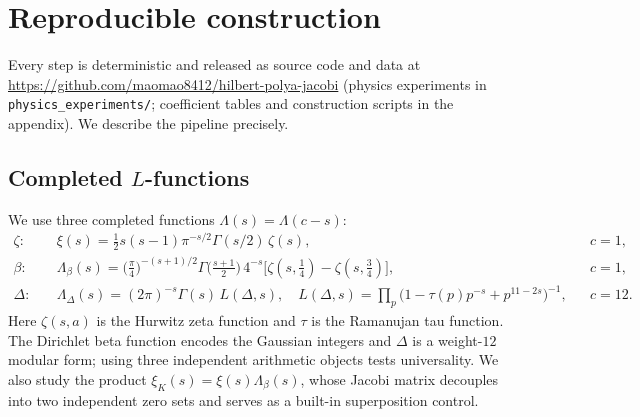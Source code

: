\documentclass[aps,prx,reprint,floatfix]{revtex4-2}
\begin{document}
\section{Reproducible construction}
\label{sec:methods}

Every step is deterministic and released as source code and data at
\url{https://github.com/maomao8412/hilbert-polya-jacobi} (physics experiments
in \texttt{physics\_experiments/}; coefficient tables and construction
scripts in the appendix). We describe the pipeline precisely.

\subsection{Completed $L$-functions}
We use three completed functions $\Lambda(s)=\Lambda(c-s)$:
\begin{align}
\zeta:\quad &\xi(s)=\tfrac12 s(s-1)\pi^{-s/2}\Gamma(s/2)\,\zeta(s),
   && c=1,\\[2pt]
\beta:\quad &\Lambda_\beta(s)=\big(\tfrac{\pi}{4}\big)^{-(s+1)/2}
   \Gamma\!\big(\tfrac{s+1}{2}\big)\,4^{-s}
   \big[\zeta(s,\tfrac14)-\zeta(s,\tfrac34)\big],
   && c=1,\\[2pt]
\Delta:\quad &\Lambda_\Delta(s)=(2\pi)^{-s}\Gamma(s)\,L(\Delta,s),\quad
   L(\Delta,s)=\prod_p\big(1-\tau(p)p^{-s}+p^{11-2s}\big)^{-1},
   && c=12.
\end{align}
Here $\zeta(s,a)$ is the Hurwitz zeta function and $\tau$ is the Ramanujan
tau function. The Dirichlet beta function encodes the Gaussian integers and
$\Delta$ is a weight-$12$ modular form; using three independent arithmetic
objects tests universality. We also study the product
$\xi_K(s)=\xi(s)\Lambda_\beta(s)$, whose Jacobi matrix decouples into two
independent zero sets and serves as a built-in superposition control.
\end{document}
